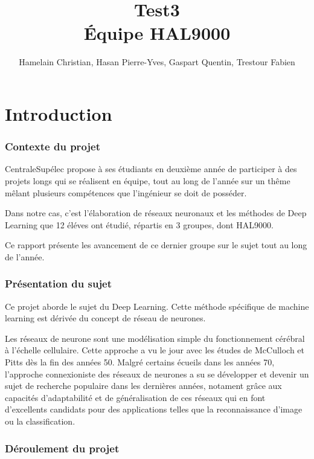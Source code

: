 \documentclass[a4paper,twoside]{report}
\title{Test3\\Équipe HAL9000}
\author{Hamelain Christian, Hasan Pierre-Yves, Gaspart Quentin, Trestour Fabien}
\begin{document}
	\maketitle


	\tableofcontents


	\part{Introduction}

		\section[Contexte]{Contexte du projet}

			CentraleSupélec propose à ses étudiants en deuxième année de participer à des projets longs qui se réalisent en équipe, tout au long de l'année sur un thême mêlant plusieurs compétences que l'ingénieur se doit de posséder.

			Dans notre cas, c'est l'élaboration de réseaux neuronaux et les méthodes de Deep Learning que 12 éléves ont étudié, répartis en 3 groupes, dont HAL9000.

			Ce rapport présente les avancement de ce dernier groupe sur le sujet tout au long de l'année.


		\section{Présentation du sujet}

			Ce projet aborde le sujet du Deep Learning. Cette méthode spécifique de machine learning est dérivée du concept de réseau de neurones.

			Les réseaux de neurone sont une modélisation simple du fonctionnement cérébral à l'échelle cellulaire. Cette approche a vu le jour avec les études de McCulloch et Pitts dès la fin des années 50. Malgré certains écueils dans les années 70, l'approche connexioniste des réseaux de neurones a su se développer et devenir un sujet de recherche populaire dans les dernières années, notament grâce aux capacités d'adaptabilité et de généralisation de ces réseaux qui en font d'excellents candidats pour des applications telles que la reconnaissance d'image ou la classification.


		\section[Déroulement]{Déroulement du projet}
\end{document}
